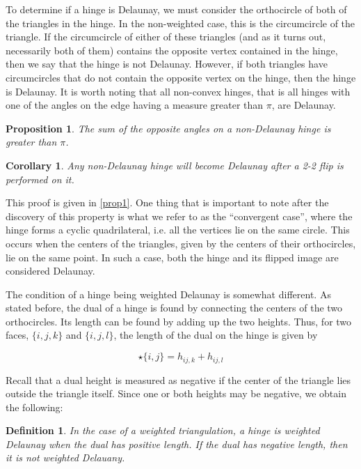 \documentclass[12pt]{article}
\newtheorem{proposition}[theorem]{Proposition}
\newtheorem{corollary}[theorem]{Corollary}
\newtheorem{definition}[theorem]{Definition}
\begin{document}
\noindent To determine if a hinge is Delaunay, we must consider the orthocircle of both of the triangles in the hinge. In the non-weighted case, this is the circumcircle of the triangle. If the circumcircle of either of these triangles (and as it turns out, necessarily both of them) contains the opposite vertex contained in the hinge, then we say that the hinge is not Delaunay. However, if both triangles have circumcircles that do not contain the opposite vertex on the hinge, then the hinge is Delaunay. It is worth noting that all non-convex hinges, that is all hinges with one of the angles on the edge having a measure greater than $\pi$, are Delaunay.\newline

\begin{proposition}
\label{NonDelProp}
The sum of the opposite angles on a non-Delaunay hinge is greater than $\pi$.
\end{proposition}

\begin{corollary}
\label{FlipProp}
Any non-Delaunay hinge will become Delaunay after a 2-2 flip is performed on it.
\end{corollary}

\noindent This proof is given in \ref{prop1}. One thing that is important to note after the discovery of this property is what we refer to as the ``convergent case'', where the hinge forms a cyclic quadrilateral, i.e. all the vertices lie on the same circle. This occurs when the centers of the triangles, given by the centers of their orthocircles, lie on the same point. In such a case, both the hinge and its flipped image are considered Delaunay.\newline

\noindent The condition of a hinge being weighted Delaunay is somewhat different. As stated before, the dual of a hinge is found by connecting the centers of the two orthocircles. Its length can be found by adding up the two heights. Thus, for two faces, $\{i,j,k\}$ and $\{i,j,l\}$, the length of the dual on the hinge is given by

$$\star\{i,j\} = h_{ij,k} + h_{ij,l}$$

\noindent Recall that a dual height is measured as negative if the center of the triangle lies outside the triangle itself. Since one or both heights may be negative, we obtain the following:
\begin{definition}
In the case of a weighted triangulation, a hinge is weighted Delaunay when the dual has positive length. If the dual has negative length, then it is not weighted Delauany. 
\end{definition}
\end{document}

